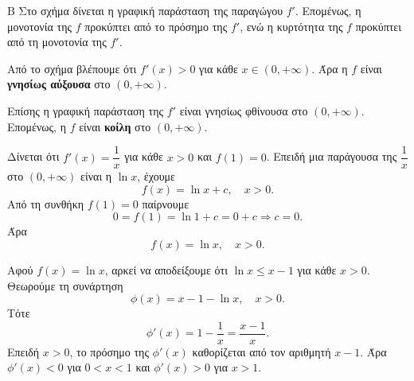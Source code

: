
\begin{thema}{Β}
Στο σχήμα δίνεται η γραφική παράσταση της παραγώγου $f'$. Επομένως, η μονοτονία της $f$ προκύπτει από το πρόσημο της $f'$, ενώ η κυρτότητα της $f$ προκύπτει από τη μονοτονία της $f'$.

\begin{center}
\end{center}

\begin{erwthma}
\item Από το σχήμα βλέπουμε ότι $f'(x)>0$ για κάθε $x\in(0,+\infty)$. Άρα η $f$ είναι \textbf{γνησίως αύξουσα} στο $(0,+\infty)$.

Επίσης η γραφική παράσταση της $f'$ είναι γνησίως φθίνουσα στο $(0,+\infty)$. Επομένως, η $f$ είναι \textbf{κοίλη} στο $(0,+\infty)$.

\item Δίνεται ότι $f'(x)=\dfrac{1}{x}$ για κάθε $x>0$ και $f(1)=0$. Επειδή μια παράγουσα της $\dfrac{1}{x}$ στο $(0,+\infty)$ είναι η $\ln x$, έχουμε
\[
f(x)=\ln x+c,\quad x>0.
\]
Από τη συνθήκη $f(1)=0$ παίρνουμε
\[
0=f(1)=\ln 1+c=0+c \Rightarrow c=0.
\]
Άρα
\[
f(x)=\ln x,\quad x>0.
\]

\item Αφού $f(x)=\ln x$, αρκεί να αποδείξουμε ότι $\ln x\leq x-1$ για κάθε $x>0$. Θεωρούμε τη συνάρτηση
\[
\phi(x)=x-1-\ln x,\quad x>0.
\]
Τότε
\[
\phi'(x)=1-\frac{1}{x}=\frac{x-1}{x}.
\]
Επειδή $x>0$, το πρόσημο της $\phi'(x)$ καθορίζεται από τον αριθμητή $x-1$. Άρα $\phi'(x)<0$ για $0<x<1$ και $\phi'(x)>0$ για $x>1$.


\end{erwthma}
\end{thema}
